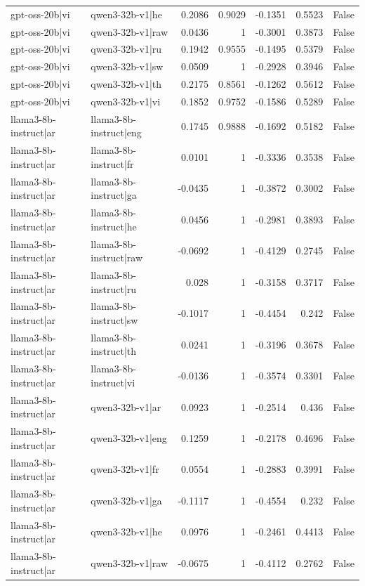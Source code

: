 \begin{table}
\begin{tabular}{l l r r r r l}
gpt-oss-20b|vi & qwen3-32b-v1|he & 0.2086 & 0.9029 & -0.1351 & 0.5523 & False \\
gpt-oss-20b|vi & qwen3-32b-v1|raw & 0.0436 & 1 & -0.3001 & 0.3873 & False \\
gpt-oss-20b|vi & qwen3-32b-v1|ru & 0.1942 & 0.9555 & -0.1495 & 0.5379 & False \\
gpt-oss-20b|vi & qwen3-32b-v1|sw & 0.0509 & 1 & -0.2928 & 0.3946 & False \\
gpt-oss-20b|vi & qwen3-32b-v1|th & 0.2175 & 0.8561 & -0.1262 & 0.5612 & False \\
gpt-oss-20b|vi & qwen3-32b-v1|vi & 0.1852 & 0.9752 & -0.1586 & 0.5289 & False \\
llama3-8b-instruct|ar & llama3-8b-instruct|eng & 0.1745 & 0.9888 & -0.1692 & 0.5182 & False \\
llama3-8b-instruct|ar & llama3-8b-instruct|fr & 0.0101 & 1 & -0.3336 & 0.3538 & False \\
llama3-8b-instruct|ar & llama3-8b-instruct|ga & -0.0435 & 1 & -0.3872 & 0.3002 & False \\
llama3-8b-instruct|ar & llama3-8b-instruct|he & 0.0456 & 1 & -0.2981 & 0.3893 & False \\
llama3-8b-instruct|ar & llama3-8b-instruct|raw & -0.0692 & 1 & -0.4129 & 0.2745 & False \\
llama3-8b-instruct|ar & llama3-8b-instruct|ru & 0.028 & 1 & -0.3158 & 0.3717 & False \\
llama3-8b-instruct|ar & llama3-8b-instruct|sw & -0.1017 & 1 & -0.4454 & 0.242 & False \\
llama3-8b-instruct|ar & llama3-8b-instruct|th & 0.0241 & 1 & -0.3196 & 0.3678 & False \\
llama3-8b-instruct|ar & llama3-8b-instruct|vi & -0.0136 & 1 & -0.3574 & 0.3301 & False \\
llama3-8b-instruct|ar & qwen3-32b-v1|ar & 0.0923 & 1 & -0.2514 & 0.436 & False \\
llama3-8b-instruct|ar & qwen3-32b-v1|eng & 0.1259 & 1 & -0.2178 & 0.4696 & False \\
llama3-8b-instruct|ar & qwen3-32b-v1|fr & 0.0554 & 1 & -0.2883 & 0.3991 & False \\
llama3-8b-instruct|ar & qwen3-32b-v1|ga & -0.1117 & 1 & -0.4554 & 0.232 & False \\
llama3-8b-instruct|ar & qwen3-32b-v1|he & 0.0976 & 1 & -0.2461 & 0.4413 & False \\
llama3-8b-instruct|ar & qwen3-32b-v1|raw & -0.0675 & 1 & -0.4112 & 0.2762 & False \\

\end{tabular}
\end{table}
